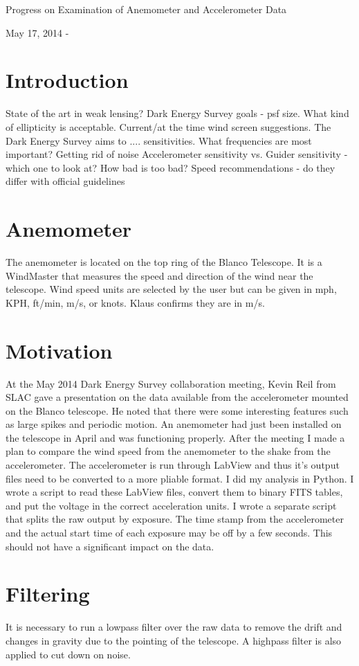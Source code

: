 \documentclass{article}
\begin{document}
\centerline{\large Progress on Examination of Anemometer and Accelerometer Data}
\centerline{May 17, 2014 - }


\section{Introduction}
State of the art in weak lensing?
Dark Energy Survey goals - psf size.
What kind of ellipticity is acceptable.
Current/at the time wind screen suggestions.
The Dark Energy Survey aims to .... sensitivities.
What frequencies are most important?
Getting rid of noise
Accelerometer sensitivity vs. Guider sensitivity - which one to look at?
How bad is too bad?
Speed recommendations - do they differ with official guidelines



\section{Anemometer}
The anemometer is located on the top ring of the Blanco Telescope. It is a WindMaster that measures the speed and direction of the wind near the telescope.
Wind speed units are selected by the user but can be given in mph, KPH, ft/min, m/s, or knots. Klaus confirms they are in m/s.

\section{Motivation}
At the May 2014 Dark Energy Survey collaboration meeting, Kevin Reil from SLAC gave a presentation on the data available from the accelerometer mounted on the Blanco telescope. He noted that there were some interesting features such as large spikes and periodic motion. An anemometer had just been installed on the telescope in April and was functioning properly. After the meeting I made a plan to compare the wind speed from the anemometer to the shake from the accelerometer. 
	The accelerometer is run through LabView and thus it's output files need to be converted to a more pliable format. I did my analysis in Python. I wrote a script to read these LabView files, convert them to binary FITS tables, and put the voltage in the correct acceleration units. I wrote a separate script that splits the raw output by exposure. The time stamp from the accelerometer and the actual start time of each exposure may be off by a few seconds. This should not have a significant impact on the data. 
	
\section{Filtering}
	It is necessary to run a lowpass filter over the raw data to remove the drift and changes in gravity due to the pointing of the telescope. A highpass filter is also applied to cut down on noise. 
\end{document}
